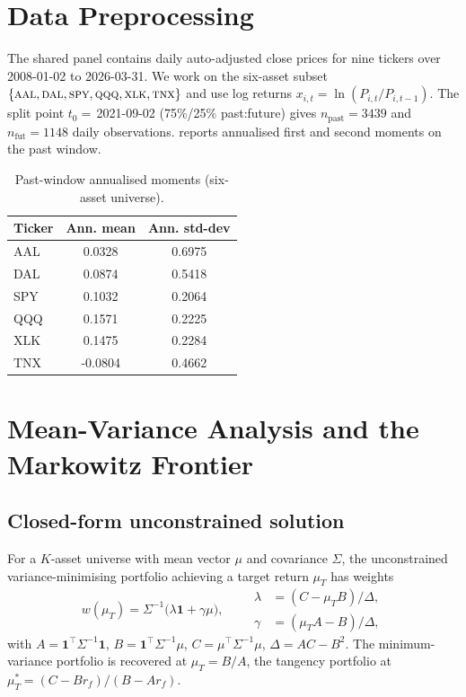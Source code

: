 \documentclass[runningheads]{llncs}
\begin{document}
\section{Data Preprocessing}\label{sec:data}
The shared panel contains daily auto-adjusted close prices for nine
tickers over 2008-01-02 to 2026-03-31. We work on the six-asset subset
$\{\textsc{aal},\textsc{dal},\textsc{spy},\textsc{qqq},\textsc{xlk},
\textsc{tnx}\}$ and use log returns
$x_{i,t}=\ln(P_{i,t}/P_{i,t-1})$. The split point
$t_{0}{=}\,$2021-09-02 (75\%/25\% past:future) gives
$n_{\text{past}}{=}\num{3439}$ and
$n_{\text{fut}}{=}\num{1148}$ daily observations.  reports
annualised first and second moments on the past window.
\begin{table}[!htbp]
\centering\small
\caption{Past-window annualised moments (six-asset universe).}\label{tab:moments}
\begin{tabular}{lS[round-precision=4]S[round-precision=4]}
\toprule
Ticker & {Ann. mean} & {Ann. std-dev}\\
\midrule
AAL & 0.0328 & 0.6975\\
DAL & 0.0874 & 0.5418\\
SPY  & 0.1032 & 0.2064\\
QQQ  & 0.1571 & 0.2225\\
XLK  & 0.1475 & 0.2284\\
TNX  & -0.0804 & 0.4662\\
\bottomrule
\end{tabular}
\end{table}

\section{Mean-Variance Analysis and the Markowitz Frontier}\label{sec:mva}
\subsection{Closed-form unconstrained solution}
For a $K$-asset universe with mean vector $\mu$ and covariance
$\Sigma$, the unconstrained variance-minimising portfolio achieving a
target return $\mu_{T}$ has weights
\begin{equation}
w(\mu_T)=\Sigma^{-1}\!\bigl(\lambda\mathbf{1}+\gamma\mu\bigr),
\qquad
\begin{aligned}
\lambda&=(C-\mu_T B)/\Delta,\\
\gamma&=(\mu_T A-B)/\Delta,
\end{aligned}
\label{eq:frontier}
\end{equation}
with $A{=}\mathbf{1}^{\top}\Sigma^{-1}\mathbf{1}$, $B{=}\mathbf{1}^{\top}\Sigma^{-1}\mu$,
$C{=}\mu^{\top}\Sigma^{-1}\mu$, $\Delta{=}AC-B^{2}$. The minimum-variance
portfolio is recovered at $\mu_T{=}B/A$, the tangency portfolio at
$\mu_{T}^{*}{=}(C-B r_{f})/(B-A r_{f})$.
\end{document}
